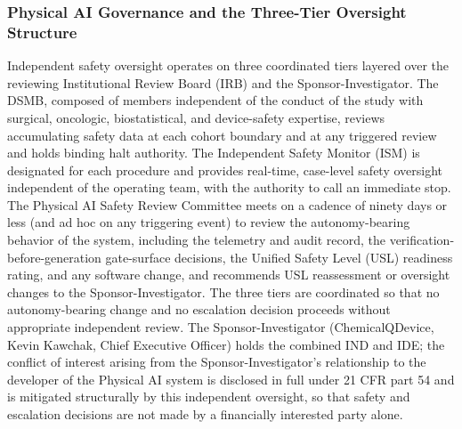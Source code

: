 \subsubsection{Physical AI Governance and the Three-Tier Oversight Structure}

Independent safety oversight operates on three coordinated tiers layered over the
reviewing Institutional Review Board (IRB) and the Sponsor-Investigator. The DSMB,
composed of members independent of the conduct of the study with surgical,
oncologic, biostatistical, and device-safety expertise, reviews accumulating safety
data at each cohort boundary and at any triggered review and holds binding halt
authority. The Independent Safety Monitor (ISM) is designated for each procedure and
provides real-time, case-level safety oversight independent of the operating team,
with the authority to call an immediate stop. The Physical AI Safety Review
Committee meets on a cadence of ninety days or less (and ad hoc on any triggering
event) to review the autonomy-bearing behavior of the system, including the
telemetry and audit record, the verification-before-generation gate-surface
decisions, the Unified Safety Level (USL) readiness rating, and any software change,
and recommends USL reassessment or oversight changes to the Sponsor-Investigator.
The three tiers are coordinated so that no autonomy-bearing change and no escalation
decision proceeds without appropriate independent review. The Sponsor-Investigator
(ChemicalQDevice, Kevin Kawchak, Chief Executive Officer) holds the combined IND and
IDE; the conflict of interest arising from the Sponsor-Investigator's relationship
to the developer of the Physical AI system is disclosed in full under 21 CFR part 54
and is mitigated structurally by this independent oversight, so that safety and
escalation decisions are not made by a financially interested party alone.


